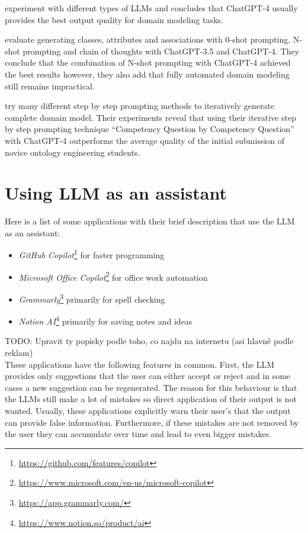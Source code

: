 \citet{BabaeiGiglou2023} experiment with different types of LLMs and concludes that ChatGPT-4 usually provides the best output quality for domain modeling tasks.

\citet{Chen2023} evaluate generating classes, attributes and associations with 0-shot prompting, N-shot prompting and chain of thoughts with ChatGPT-3.5 and ChatGPT-4. They conclude that the combination of N-shot prompting with ChatGPT-4 achieved the best results however, they also add that fully automated domain modeling still remains impractical.

\citet{Saeedizade2024} try many different step by step prompting methods to iteratively generate complete domain model. Their experiments reveal that using their iterative step by step prompting technique ``Competency Question by Competency Question'' with ChatGPT-4 outperforms the average quality of the initial submission of novice ontology engineering students. 


\section{Using LLM as an assistant}
\label{section:llm_as_an_assistant}

Here is a list of some applications with their brief description that use the LLM as an assistant:

\begin{itemize}
\item \textit{GitHub Copilot}\footnote{\url{https://github.com/features/copilot}} for faster programming
\item \textit{Microsoft Office Copilot}\footnote{\url{https://www.microsoft.com/en-us/microsoft-copilot}} for office work automation
\item \textit{Grammarly}\footnote{\url{https://app.grammarly.com/}} primarily for spell checking
\item \textit{Notion AI}\footnote{\url{https://www.notion.so/product/ai}} primarily for saving notes and ideas \\
\end{itemize}

TODO: Upravit ty popisky podle toho, co najdu na internetu (asi hlavně podle reklam) \\

These applications have the following features in common. First, the LLM provides only suggestions that the user can either accept or reject and in some cases a new suggestion can be regenerated. The reason for this behaviour is that the LLMs still make a lot of mistakes so direct application of their output is not wanted. Usually, these applications explicitly warn their user's that the output can provide false information. Furthermore, if these mistakes are not removed by the user they can accumulate over time and lead to even bigger mistakes.

